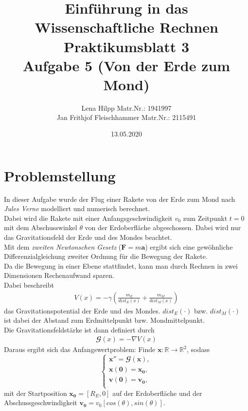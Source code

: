 \documentclass[11pt,a4paper]{article}
\title{Einf\"uhrung in das Wissenschaftliche Rechnen\\
  Praktikumsblatt 3\\
  Aufgabe 5 (Von der Erde zum Mond)}
\author{Lena Hilpp Matr.Nr.: 1941997\\Jan Frithjof Fleischhammer Matr.Nr.: 2115491}
\date{13.05.2020}
\begin{document}
  
  \maketitle
  
  \section*{Problemstellung}
  In dieser Aufgabe wurde der Flug einer Rakete von der Erde zum Mond nach \textit{Jules Verne} modelliert und numerisch berechnet.\\
  
  Dabei wird die Rakete mit einer Anfangsgeschwindigkeit $v_0$ zum Zeitpunkt $t=0$ mit dem Abschusswinkel $\theta$ von der Erdoberfl\"ache abgeschossen. Dabei wird nur das Gravitationsfeld der Erde und des Mondes beachtet.\\
  Mit dem \textit{zweiten Newtonschen Gesetz} ($\mathbf{F}=m \mathbf{a}$) ergibt sich eine gew\"ohnliche Differenzialgleichung zweiter Ordnung f\"ur die Bewegung der Rakete.\\
  Da die Bewegung in einer Ebene stattfindet, kann man durch Rechnen in zwei Dimensionen Rechenaufwand sparen.\\
  
  Dabei beschreibt
  \begin{align*}
  V(x)=-\gamma(\frac{m_E}{dist_E(x)}+\frac{m_M}{dist_M(x)})
\end{align*}    
 das Gravitationspotential der Erde und des Mondes. $dist_E(\cdot)$ bzw. $dist_M(\cdot)$ ist dabei der Abstand zum Erdmittelpunkt bzw. Mondmittelpunkt.\\
 
 Die Gravitationsfeldst\"arke ist dann definiert durch
 \begin{align*}
 \mathbfcal{G}(x)=-\nabla V(x)
 \end{align*}
Daraus ergibt sich das Anfangswertproblem: Finde $\mathbf{x}:\mathbb{R}\to{\mathbb{R}}^2$, sodass
\begin{equation}
\begin{cases}
\mathbf{x}'' = \mathbfcal{G}(\mathbf{x}), \\
\mathbf{x}(\mathbf{0}) = \mathbf{x_0}, \\
\mathbf{v}(\mathbf{0}) = \mathbf{v_0}, \\

\end{cases}
\end{equation}
mit der Startposition $\mathbf{x_0}=[R_E,0]$ auf der Erdoberfl\"ache und der Abschussgeschwindigkeit $\mathbf{v_0}=v_0[cos(\theta),sin(\theta)]$.
\end{document}
